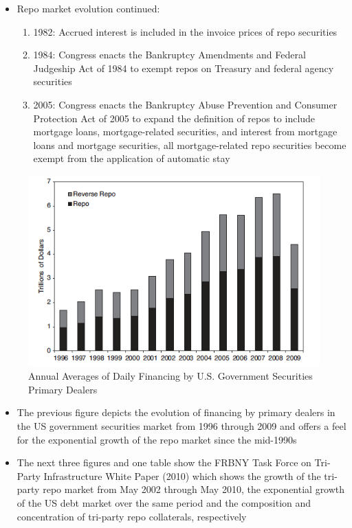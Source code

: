 \documentclass[11pt]{beamer}
\begin{document}
\begin{frame}
\begin{itemize}
\item Repo market evolution continued:
\begin{enumerate}
\item 1982: Accrued interest is included in the invoice prices of repo securities
\item 1984: Congress enacts the Bankruptcy Amendments and Federal Judgeship Act of 1984 to exempt repos on Treasury and federal agency securities
\item 2005: Congress enacts the Bankruptcy Abuse Prevention and Consumer Protection Act of 2005 to expand the definition of repos to include mortgage loans, mortgage-related securities, and interest from
mortgage loans and mortgage securities, all mortgage-related repo
securities become exempt from the application of automatic stay
\end{enumerate}
\end{itemize}
\end{frame}

\begin{frame}
\begin{figure}
\includegraphics[width=\textwidth]{11_4.png}
\caption{Annual Averages of Daily Financing by U.S. Government Securities Primary Dealers}
\end{figure}
\end{frame}

\begin{frame}
\begin{itemize}
\item The previous figure depicts the evolution of financing by primary dealers in the US government securities market from 1996 through 2009 and offers a feel for the exponential growth of the repo market since the mid-1990s
\item The next three figures and one table show the FRBNY Task Force on Tri-Party Infrastructure White Paper (2010) which shows the growth of the tri-party repo market from May 2002 through May 2010, the exponential growth of the US debt market over the same period and the composition and concentration of tri-party repo collaterals, respectively
\end{itemize}
\end{frame}
\end{document}
